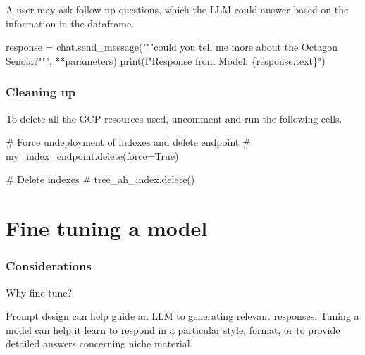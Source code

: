\documentclass[
  letterpaper,
  DIV=11,
  numbers=noendperiod]{scrreprt}
\newenvironment{Shaded}{\begin{snugshade}}{\end{snugshade}}
\newcommand{\BuiltInTok}[1]{\textcolor[rgb]{0.00,0.23,0.31}{#1}}
\newcommand{\CommentTok}[1]{\textcolor[rgb]{0.37,0.37,0.37}{#1}}
\newcommand{\NormalTok}[1]{\textcolor[rgb]{0.00,0.23,0.31}{#1}}
\newcommand{\OperatorTok}[1]{\textcolor[rgb]{0.37,0.37,0.37}{#1}}
\newcommand{\SpecialCharTok}[1]{\textcolor[rgb]{0.37,0.37,0.37}{#1}}
\newcommand{\SpecialStringTok}[1]{\textcolor[rgb]{0.13,0.47,0.30}{#1}}
\newcommand{\StringTok}[1]{\textcolor[rgb]{0.13,0.47,0.30}{#1}}
\begin{document}
A user may ask follow up questions, which the LLM could answer based on
the information in the dataframe.

\begin{Shaded}
\begin{Highlighting}[]
\NormalTok{response }\OperatorTok{=}\NormalTok{ chat.send\_message(}\StringTok{"""could you tell me more about the Octagon Senoia?"""}\NormalTok{, }\OperatorTok{**}\NormalTok{parameters)}
\BuiltInTok{print}\NormalTok{(}\SpecialStringTok{f"Response from Model: }\SpecialCharTok{\{}\NormalTok{response}\SpecialCharTok{.}\NormalTok{text}\SpecialCharTok{\}}\SpecialStringTok{"}\NormalTok{)}
\end{Highlighting}
\end{Shaded}

\hypertarget{cleaning-up}{%
\subsection{Cleaning up}\label{cleaning-up}}

To delete all the GCP resources used, uncomment and run the following
cells.

\begin{Shaded}
\begin{Highlighting}[]
\CommentTok{\# Force undeployment of indexes and delete endpoint}
\CommentTok{\# my\_index\_endpoint.delete(force=True)}
\end{Highlighting}
\end{Shaded}

\begin{Shaded}
\begin{Highlighting}[]
\CommentTok{\# Delete indexes}
\CommentTok{\# tree\_ah\_index.delete()}
\end{Highlighting}
\end{Shaded}

\hypertarget{fine-tuning-a-model}{%
\chapter{Fine tuning a model}\label{fine-tuning-a-model}}

\hypertarget{considerations}{%
\subsection{Considerations}\label{considerations}}

Why fine-tune?

Prompt design can help guide an LLM to generating relevant responses.
Tuning a model can help it learn to respond in a particular style,
format, or to provide detailed answers concerning niche material.
\end{document}
